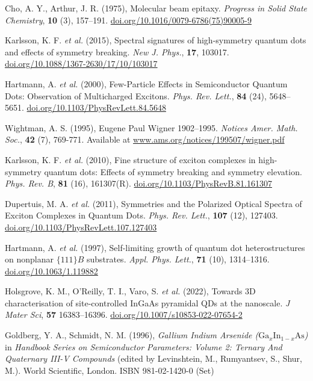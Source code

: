 \documentclass[12pt]{report}
\begin{document}
\begin{thebibliography}{10}
Cho, A. Y., Arthur, J. R. (1975), Molecular beam epitaxy. \textit{Progress in Solid State Chemistry}, \textbf{10} (3), 157--191. \href{https://doi.org/10.1016/0079-6786(75)90005-9}{doi.org/10.1016/0079-6786(75)90005-9}

Karlsson, K. F. \textit{et al.} (2015), Spectral signatures of high-symmetry quantum dots and effects of symmetry breaking. \textit{New J. Phys.}, \textbf{17}, 103017. \href{https://doi.org/10.1088/1367-2630/17/10/103017}{doi.org/10.1088/1367-2630/17/10/103017}

Hartmann, A. \textit{et al.} (2000), Few-Particle Effects in Semiconductor Quantum Dots: Observation of Multicharged Excitons. \textit{Phys. Rev. Lett.}, \textbf{84} (24), 5648--5651. \href{https://doi.org/10.1103/PhysRevLett.84.5648}{doi.org/10.1103/PhysRevLett.84.5648}

Wightman, A. S. (1995), Eugene Paul Wigner 1902--1995. \textit{Notices Amer. Math. Soc.}, \textbf{42} (7), 769-771. Available at \href{https://www.ams.org/notices/199507/wigner.pdf}{www.ams.org/notices/199507/wigner.pdf}

Karlsson, K. F. \textit{et al.} (2010), Fine structure of exciton complexes in high-symmetry quantum dots: Effects of symmetry breaking and symmetry elevation. \textit{Phys. Rev. B}, \textbf{81} (16), 161307(R). \href{https://doi.org/10.1103/PhysRevB.81.161307}{doi.org/10.1103/PhysRevB.81.161307}

Dupertuis, M. A. \textit{et al.} (2011), Symmetries and the Polarized Optical Spectra of Exciton Complexes in Quantum Dots. \textit{Phys. Rev. Lett.}, \textbf{107} (12), 127403. \href{https://doi.org/10.1103/PhysRevLett.107.127403}{doi.org/10.1103/PhysRevLett.107.127403}

Hartmann, A. \textit{et al.} (1997), Self-limiting growth of quantum dot heterostructures on nonplanar $\{111\}B$ substrates. \textit{Appl. Phys. Lett.}, \textbf{71} (10), 1314--1316. \href{https://doi.org/10.1063/1.119882}{doi.org/10.1063/1.119882}

Holsgrove, K. M., O'Reilly, T. I., Varo, S. \textit{et al.} (2022), Towards 3D characterisation of site-controlled InGaAs pyramidal QDs at the nanoscale. \textit{J Mater Sci}, \textbf{57} 16383--16396. \href{https://doi.org/10.1007/s10853-022-07654-2}{doi.org/10.1007/s10853-022-07654-2}

Goldberg, Y. A., Schmidt, N. M. (1996), \textit{Gallium Indium Arsenide ($\text{Ga}_{x}\text{In}_{1-x}\text{As}$)} in \textit{Handbook Series on Semiconductor Parameters: Volume 2: Ternary And Quaternary III-V Compounds} (edited by Levinshtein, M., Rumyantsev, S., Shur, M.). World Scientific, London. ISBN  981-02-1420-0 (Set)


\end{thebibliography}
\end{document}
